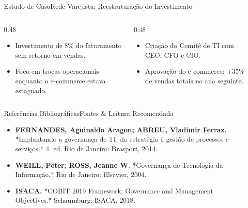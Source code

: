 \begin{senaiframe}{Estudo de Caso}{Rede Varejista: Reestruturação do Investimento}
  \begin{columns}[t]
    \begin{column}{0.48\textwidth}
      \begin{tcolorbox}[senairedcard, title={Problema Diagnosticado}]
        \begin{itemize}
          \item Investimento de 8\% do faturamento sem retorno em vendas.
          \item Foco em trocas operacionais enquanto o e-commerce estava estagnado.
        \end{itemize}
      \end{tcolorbox}
    \end{column}
    \begin{column}{0.48\textwidth}
      \begin{tcolorbox}[senaigreencard, title={Resultado com Governança}]
        \begin{itemize}
          \item Criação do Comitê de TI com CEO, CFO e CIO.
          \item Aprovação do e-commerce: +35\% de vendas totais no ano seguinte.
        \end{itemize}
      \end{tcolorbox}
    \end{column}
  \end{columns}
\end{senaiframe}

\begin{senaiframe}{Referências Bibliográficas}{Fontes \& Leitura Recomendada}
  \vspace{0.5cm}
  \begin{tcolorbox}[senaicard, title={Obras de Referência}]
    \begin{itemize}
      \item \textbf{FERNANDES, Aguinaldo Aragon; ABREU, Vladimir Ferraz.} *Implantando a governança de TI: da estratégia à gestão de processos e serviços.* 4. ed. Rio de Janeiro: Brasport, 2014.
      \item \textbf{WEILL, Peter; ROSS, Jeanne W.} *Governança de Tecnologia da Informação.* Rio de Janeiro: Elsevier, 2004.
      \item \textbf{ISACA.} *COBIT 2019 Framework: Governance and Management Objectives.* Schaumburg: ISACA, 2018.
    \end{itemize}
  \end{tcolorbox}
\end{senaiframe}

